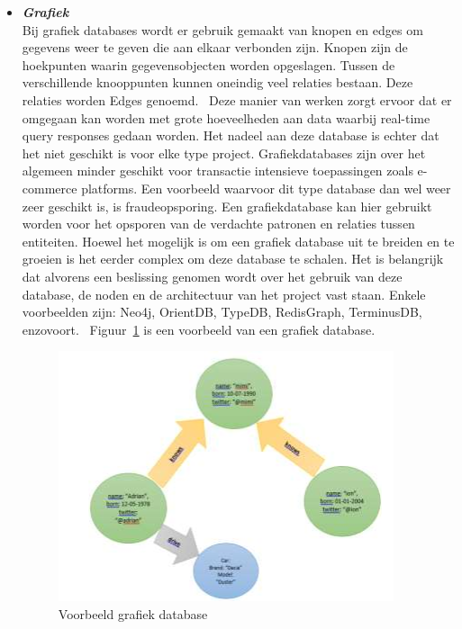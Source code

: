 \begin{itemize}
      \item \textbf{\textit{Grafiek}} \\
            Bij grafiek databases wordt er gebruik gemaakt van knopen en edges om gegevens weer te geven die aan elkaar verbonden zijn. Knopen zijn de hoekpunten waarin gegevensobjecten worden opgeslagen. Tussen de verschillende knooppunten kunnen oneindig veel relaties bestaan. Deze relaties worden Edges genoemd.~\autocite{Amazon} Deze manier van werken zorgt ervoor dat er omgegaan kan worden met grote hoeveelheden aan data waarbij real-time query responses gedaan worden. Het nadeel aan deze database is echter dat het niet geschikt is voor elke type project. Grafiekdatabases zijn over het algemeen minder geschikt voor transactie intensieve toepassingen zoals e-commerce platforms. Een voorbeeld waarvoor dit type database dan wel weer zeer geschikt is, is fraudeopsporing. Een grafiekdatabase kan hier gebruikt worden voor het opsporen van de verdachte patronen en relaties tussen entiteiten.  Hoewel het mogelijk is om een grafiek database uit te breiden en te groeien is het eerder complex om deze database te schalen. Het is belangrijk dat alvorens een beslissing genomen wordt over het gebruik van deze database, de noden en de architectuur van het project vast staan. Enkele voorbeelden zijn: Neo4j, OrientDB, TypeDB, RedisGraph, TerminusDB, enzovoort.~\autocite{DistributedDatabase2022} Figuur~\ref{fig:grafiekdb} is een voorbeeld van een grafiek database.
            
            \begin{figure}[H]
                \centering
                \includegraphics[width=0.7\linewidth]{graphics/grafiekdb}
                \caption[Voorbeeld grafiek database]{Voorbeeld grafiek database  ~\autocite{DistributedDatabase2022}}
                \label{fig:grafiekdb}
            \end{figure}
            
\end{itemize}

